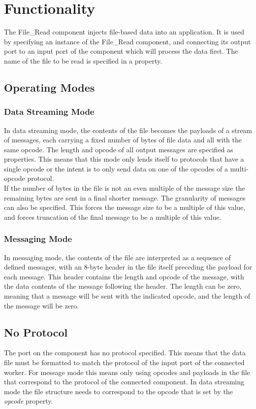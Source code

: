 \documentclass{article}
\begin{document}
\section*{Functionality}
\begin{flushleft}
The File\_Read component injects file-based data into an application. It is used
by specifying an instance of the File\_Read component, and connecting its output port to
an input port of the component which will process the data first. The name of the file to
be read is specified in a property.
\subsection*{Operating Modes}
\subsubsection*{Data Streaming Mode}
In data streaming mode, the contents of the file becomes the payloads of a stream of
messages, each carrying a fixed number of bytes of file data and all with
the same opcode. The length and opcode of all output messages are specified as
properties. This means that this mode only lends itself to protocols that have a single opcode or the intent is to only send data on one of the opcodes of a multi-opcode protocol.\\ \medskip \medskip
If the number of bytes in the file is not an even multiple of the message size the
remaining bytes are sent in a final shorter message. The granularity of messages can
also be specified. This forces the message size to be a multiple of this value, and
forces truncation of the final message to be a multiple of this value.
\subsubsection*{Messaging Mode}
In messaging mode, the contents of the file are interpreted as a sequence of defined
messages, with an 8-byte header in the file itself preceding the payload for each message.
This header contains the length and opcode of the message, with the data contents of
the message following the header. The length can be zero, meaning that a message
will be sent with the indicated opcode, and the length of the message will be zero.\\
\medskip \medskip

\subsection*{No Protocol}
The port on the component has no protocol specified.  This means that the data file must be formatted to match the protocol of the input port of the connected worker.  For message mode this means only using opcodes and payloads in the file that correspond to the protocol of the connected component.  In data streaming mode the file structure needs to correspond to the opcode that is set by the \textit{opcode} property.

\end{flushleft}
\end{document}
